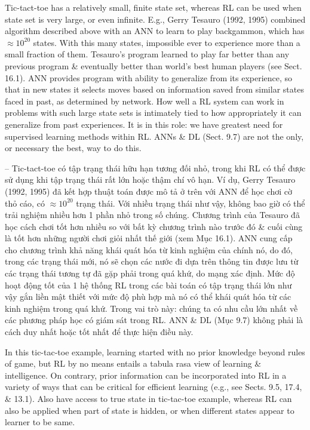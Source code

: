 \documentclass{article}
\begin{document}
\begin{itemize}
\begin{itemize}
        Tic-tact-toe has a relatively small, finite state set, whereas RL can be used when state set is very large, or even infinite. E.g., Gerry Tesauro (1992, 1995) combined algorithm described above with an ANN to learn to play backgammon, which has $\approx10^{20}$ states. With this many states, impossible ever to experience more than a small fraction of them. Tesauro's program learned to play far better than any previous program \& eventually better than world's best human players (see Sect. 16.1). ANN provides program with ability to generalize from its experience, so that in new states it selects moves based on information saved from similar states faced in past, as determined by network. How well a RL system can work in problems with such large state sets is intimately tied to how appropriately it can generalize from past experiences. It is in this role: we have greatest need for supervised learning methods within RL. ANNs \& DL (Sect. 9.7) are not the only, or necessary the best, way to do this.

        -- Tic-tact-toe có tập trạng thái hữu hạn tương đối nhỏ, trong khi RL có thể được sử dụng khi tập trạng thái rất lớn hoặc thậm chí vô hạn. Ví dụ, Gerry Tesauro (1992, 1995) đã kết hợp thuật toán được mô tả ở trên với ANN để học chơi cờ thỏ cáo, có $\approx10^{20}$ trạng thái. Với nhiều trạng thái như vậy, không bao giờ có thể trải nghiệm nhiều hơn 1 phần nhỏ trong số chúng. Chương trình của Tesauro đã học cách chơi tốt hơn nhiều so với bất kỳ chương trình nào trước đó \& cuối cùng là tốt hơn những người chơi giỏi nhất thế giới (xem Mục 16.1). ANN cung cấp cho chương trình khả năng khái quát hóa từ kinh nghiệm của chính nó, do đó, trong các trạng thái mới, nó sẽ chọn các nước đi dựa trên thông tin được lưu từ các trạng thái tương tự đã gặp phải trong quá khứ, do mạng xác định. Mức độ hoạt động tốt của 1 hệ thống RL trong các bài toán có tập trạng thái lớn như vậy gắn liền mật thiết với mức độ phù hợp mà nó có thể khái quát hóa từ các kinh nghiệm trong quá khứ. Trong vai trò này: chúng ta có nhu cầu lớn nhất về các phương pháp học có giám sát trong RL. ANN \& DL (Mục 9.7) không phải là cách duy nhất hoặc tốt nhất để thực hiện điều này.

        In this tic-tac-toe example, learning started with no prior knowledge beyond rules of game, but RL by no means entails a tabula rasa view of learning \& intelligence. On contrary, prior information can be incorporated into RL in a variety of ways that can be critical for efficient learning (e.g., see Sects. 9.5, 17.4, \& 13.1). Also have access to true state in tic-tac-toe example, whereas RL can also be applied when part of state is hidden, or when different states appear to learner to be same.


\end{itemize}
\end{itemize}
\end{document}
